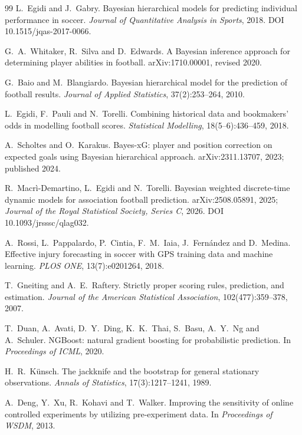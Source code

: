 \documentclass[11pt,a4paper]{article}
\begin{document}
\begin{thebibliography}{99}
 L.\ Egidi and J.\ Gabry. Bayesian hierarchical models for predicting individual performance in soccer. \emph{Journal of Quantitative Analysis in Sports}, 2018. DOI 10.1515/jqas-2017-0066.

 G.\ A.\ Whitaker, R.\ Silva and D.\ Edwards. A Bayesian inference approach for determining player abilities in football. arXiv:1710.00001, revised 2020.

 G.\ Baio and M.\ Blangiardo. Bayesian hierarchical model for the prediction of football results. \emph{Journal of Applied Statistics}, 37(2):253--264, 2010.

 L.\ Egidi, F.\ Pauli and N.\ Torelli. Combining historical data and bookmakers' odds in modelling football scores. \emph{Statistical Modelling}, 18(5--6):436--459, 2018.

 A.\ Scholtes and O.\ Karakus. Bayes-xG: player and position correction on expected goals using Bayesian hierarchical approach. arXiv:2311.13707, 2023; published 2024.

 R.\ Macr\`i-Demartino, L.\ Egidi and N.\ Torelli. Bayesian weighted discrete-time dynamic models for association football prediction. arXiv:2508.05891, 2025; \emph{Journal of the Royal Statistical Society, Series C}, 2026. DOI 10.1093/jrsssc/qlag032.

 A.\ Rossi, L.\ Pappalardo, P.\ Cintia, F.\ M.\ Iaia, J.\ Fernández and D.\ Medina. Effective injury forecasting in soccer with GPS training data and machine learning. \emph{PLOS ONE}, 13(7):e0201264, 2018.

 T.\ Gneiting and A.\ E.\ Raftery. Strictly proper scoring rules, prediction, and estimation. \emph{Journal of the American Statistical Association}, 102(477):359--378, 2007.

 T.\ Duan, A.\ Avati, D.\ Y.\ Ding, K.\ K.\ Thai, S.\ Basu, A.\ Y.\ Ng and A.\ Schuler. NGBoost: natural gradient boosting for probabilistic prediction. In \emph{Proceedings of ICML}, 2020.

 H.\ R.\ Künsch. The jackknife and the bootstrap for general stationary observations. \emph{Annals of Statistics}, 17(3):1217--1241, 1989.

 A.\ Deng, Y.\ Xu, R.\ Kohavi and T.\ Walker. Improving the sensitivity of online controlled experiments by utilizing pre-experiment data. In \emph{Proceedings of WSDM}, 2013.


\end{thebibliography}
\end{document}
